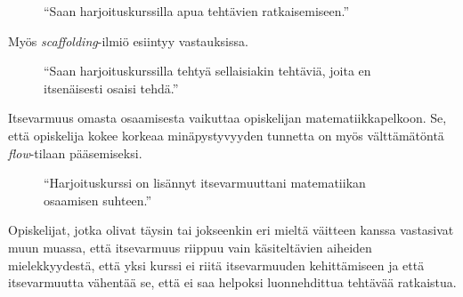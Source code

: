 \begin{figure}[h!]
\centering
{}
\caption{``Saan harjoituskurssilla apua tehtävien ratkaisemiseen.''}
\end{figure}

Myös \emph{scaffolding}-ilmiö esiintyy vastauksissa.

\begin{figure}[h!]
\centering
{}
\caption{``Saan harjoituskurssilla tehtyä sellaisiakin tehtäviä, joita en itsenäisesti osaisi tehdä.''}
\end{figure}

Itsevarmuus omasta osaamisesta vaikuttaa opiskelijan matematiikkapelkoon.
Se, että opiskelija kokee korkeaa minäpystyvyyden tunnetta on myös välttämätöntä \emph{flow}-tilaan pääsemiseksi.

\begin{figure}[h!]
\centering
{}
\caption{``Harjoituskurssi on lisännyt itsevarmuuttani matematiikan osaamisen suhteen.''}
\end{figure}

Opiskelijat, jotka olivat täysin tai jokseenkin eri mieltä väitteen kanssa vastasivat muun muassa, että itsevarmuus riippuu vain käsiteltävien aiheiden mielekkyydestä, että yksi kurssi ei riitä itsevarmuuden kehittämiseen ja että itsevarmuutta vähentää se, että ei saa helpoksi luonnehdittua tehtävää ratkaistua.


